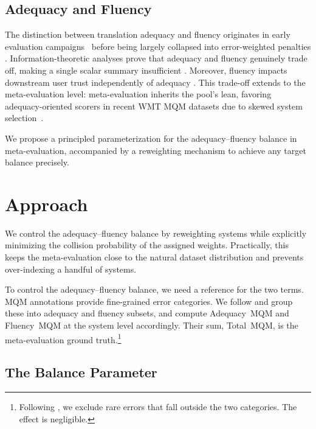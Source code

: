 \documentclass[11pt]{article}
\begin{document}
\subsection{Adequacy and Fluency}

The distinction between translation adequacy and fluency originates in early evaluation campaigns~\citep{white-etal-1994-arpa} before being largely collapsed into error-weighted penalties \citep{lommel-etal-2014-multidimensional}. Information-theoretic analyses prove that adequacy and fluency genuinely trade off, making a single scalar summary insufficient \citep{flamich2025feedbirdsscoreaccuracynaturalness}. Moreover, fluency impacts downstream user trust independently of adequacy \citep{martindale-carpuat-2018-fluency}.
This trade-off extends to the meta-evaluation level: meta-evaluation inherits the pool's lean, favoring adequacy-oriented scorers in recent WMT MQM datasets due to skewed system selection~\citep{shayegh-etal-2025-feeding}.

We propose a principled parameterization for the adequacy–fluency balance in meta-evaluation, accompanied by a reweighting mechanism to achieve any target balance precisely.

\section{Approach}\label{sec:approach}

We control the adequacy--fluency balance by reweighting systems while explicitly minimizing the collision probability of the assigned weights. Practically, this keeps the meta-evaluation close to the natural dataset distribution and prevents over-indexing a handful of systems.

To control the adequacy--fluency balance, we need a reference for the two terms. MQM annotations provide fine-grained error categories. We follow \citet{flamich2025feedbirdsscoreaccuracynaturalness}  and group these into adequacy and fluency subsets, and compute Adequacy~MQM and Fluency~MQM at the system level accordingly. Their sum, Total~MQM, is the meta-evaluation ground truth.\footnote{Following \citet{shayegh-etal-2025-feeding}, we exclude rare errors that fall outside the two categories. The effect is negligible.}

 \subsection{The Balance Parameter}
\end{document}
